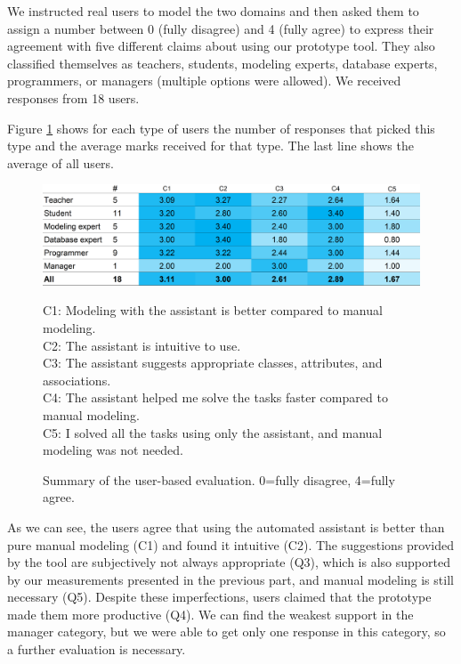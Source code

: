 We instructed real users to model the two domains and then asked them to assign a number between 0 (fully disagree) and 4 (fully agree) to express their agreement with five different claims about using our prototype tool.
They also classified themselves as teachers, students, modeling experts, database experts, programmers, or managers (multiple options were allowed).
We received responses from 18 users.

Figure \ref{fig:user-based-evaluation} shows for each type of users the number of responses that picked this type and the average marks received for that type. The last line shows the average of all users.

\begin{figure}[!h]
    \includegraphics[width=1\linewidth]{img/user-based-evaluation.png} \\
    \scriptsize
\raggedright{C1: Modeling with the assistant is better compared to manual modeling. \\
C2: The assistant is intuitive to use.\\
C3: The assistant suggests appropriate classes, attributes, and associations.\\
C4: The assistant helped me solve the tasks faster compared to manual modeling.\\
C5: I solved all the tasks using only the assistant, and manual modeling was not needed.}
    \caption{Summary of the user-based evaluation. 0=fully disagree, 4=fully agree.}
    \label{fig:user-based-evaluation}
\end{figure}

As we can see, the users agree that using the automated assistant is better than pure manual modeling (C1) and found it intuitive (C2).
The suggestions provided by the tool are subjectively not always appropriate (Q3), which is also supported by our measurements presented in the previous part, and manual modeling is still necessary (Q5).
Despite these imperfections, users claimed that the prototype made them more productive (Q4).
We can find the weakest support in the manager category, but we were able to get only one response in this category, so a further evaluation is necessary.